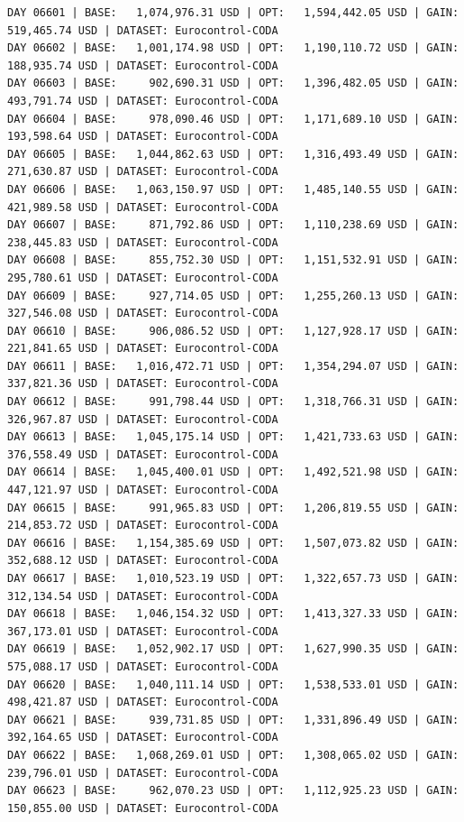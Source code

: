 \documentclass[11pt,a4paper]{article}
\begin{document}
\begin{verbatim}
DAY 06601 | BASE:   1,074,976.31 USD | OPT:   1,594,442.05 USD | GAIN: 519,465.74 USD | DATASET: Eurocontrol-CODA
DAY 06602 | BASE:   1,001,174.98 USD | OPT:   1,190,110.72 USD | GAIN: 188,935.74 USD | DATASET: Eurocontrol-CODA
DAY 06603 | BASE:     902,690.31 USD | OPT:   1,396,482.05 USD | GAIN: 493,791.74 USD | DATASET: Eurocontrol-CODA
DAY 06604 | BASE:     978,090.46 USD | OPT:   1,171,689.10 USD | GAIN: 193,598.64 USD | DATASET: Eurocontrol-CODA
DAY 06605 | BASE:   1,044,862.63 USD | OPT:   1,316,493.49 USD | GAIN: 271,630.87 USD | DATASET: Eurocontrol-CODA
DAY 06606 | BASE:   1,063,150.97 USD | OPT:   1,485,140.55 USD | GAIN: 421,989.58 USD | DATASET: Eurocontrol-CODA
DAY 06607 | BASE:     871,792.86 USD | OPT:   1,110,238.69 USD | GAIN: 238,445.83 USD | DATASET: Eurocontrol-CODA
DAY 06608 | BASE:     855,752.30 USD | OPT:   1,151,532.91 USD | GAIN: 295,780.61 USD | DATASET: Eurocontrol-CODA
DAY 06609 | BASE:     927,714.05 USD | OPT:   1,255,260.13 USD | GAIN: 327,546.08 USD | DATASET: Eurocontrol-CODA
DAY 06610 | BASE:     906,086.52 USD | OPT:   1,127,928.17 USD | GAIN: 221,841.65 USD | DATASET: Eurocontrol-CODA
DAY 06611 | BASE:   1,016,472.71 USD | OPT:   1,354,294.07 USD | GAIN: 337,821.36 USD | DATASET: Eurocontrol-CODA
DAY 06612 | BASE:     991,798.44 USD | OPT:   1,318,766.31 USD | GAIN: 326,967.87 USD | DATASET: Eurocontrol-CODA
DAY 06613 | BASE:   1,045,175.14 USD | OPT:   1,421,733.63 USD | GAIN: 376,558.49 USD | DATASET: Eurocontrol-CODA
DAY 06614 | BASE:   1,045,400.01 USD | OPT:   1,492,521.98 USD | GAIN: 447,121.97 USD | DATASET: Eurocontrol-CODA
DAY 06615 | BASE:     991,965.83 USD | OPT:   1,206,819.55 USD | GAIN: 214,853.72 USD | DATASET: Eurocontrol-CODA
DAY 06616 | BASE:   1,154,385.69 USD | OPT:   1,507,073.82 USD | GAIN: 352,688.12 USD | DATASET: Eurocontrol-CODA
DAY 06617 | BASE:   1,010,523.19 USD | OPT:   1,322,657.73 USD | GAIN: 312,134.54 USD | DATASET: Eurocontrol-CODA
DAY 06618 | BASE:   1,046,154.32 USD | OPT:   1,413,327.33 USD | GAIN: 367,173.01 USD | DATASET: Eurocontrol-CODA
DAY 06619 | BASE:   1,052,902.17 USD | OPT:   1,627,990.35 USD | GAIN: 575,088.17 USD | DATASET: Eurocontrol-CODA
DAY 06620 | BASE:   1,040,111.14 USD | OPT:   1,538,533.01 USD | GAIN: 498,421.87 USD | DATASET: Eurocontrol-CODA
DAY 06621 | BASE:     939,731.85 USD | OPT:   1,331,896.49 USD | GAIN: 392,164.65 USD | DATASET: Eurocontrol-CODA
DAY 06622 | BASE:   1,068,269.01 USD | OPT:   1,308,065.02 USD | GAIN: 239,796.01 USD | DATASET: Eurocontrol-CODA
DAY 06623 | BASE:     962,070.23 USD | OPT:   1,112,925.23 USD | GAIN: 150,855.00 USD | DATASET: Eurocontrol-CODA

\end{verbatim}
\end{document}
